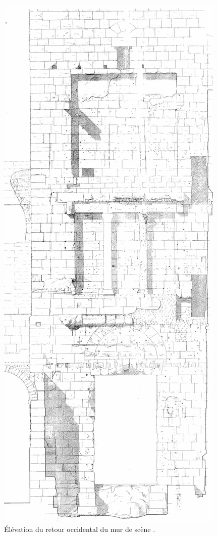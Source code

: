 \begin{figure}[!h]
	\includegraphics[height=0.8\paperheight]{images/retourOccidentalMur}
	\caption[Elévation du retour du mur de scèn.e]{Élévation du retour occidental du mur de scène \cite[Pl. XXVII]{orangePl}.}
	\label{retourmur} 
\end{figure} 

